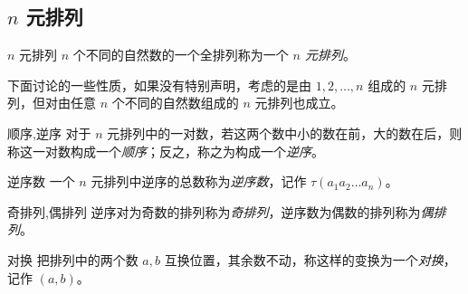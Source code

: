 \subsection{$n$ 元排列}

\begin{definition}{$n$ 元排列}
	$n$ 个不同的自然数的一个全排列称为一个 \emph{$n$ 元排列}。
\end{definition}

下面讨论的一些性质，如果没有特别声明，考虑的是由 $1, 2, \ldots, n$ 组成的 $n$ 元排列，但对由任意 $n$ 个不同的自然数组成的 $n$ 元排列也成立。

\begin{definition}{顺序,逆序}
	对于 $n$ 元排列中的一对数，若这两个数中小的数在前，大的数在后，则称这一对数构成一个\emph{顺序}；反之，称之为构成一个\emph{逆序}。
\end{definition}

\begin{definition}{逆序数}
	一个 $n$ 元排列中逆序的总数称为\emph{逆序数}，记作 $\tau(a_1 a_2 \ldots a_n)$。
\end{definition}

\begin{definition}{奇排列,偶排列}
	逆序对为奇数的排列称为\emph{奇排列}，逆序数为偶数的排列称为\emph{偶排列}。
\end{definition}

\begin{definition}{对换}
	把排列中的两个数 $a, b$ 互换位置，其余数不动，称这样的变换为一个\emph{对换}，记作 $(a, b)$。
\end{definition}
